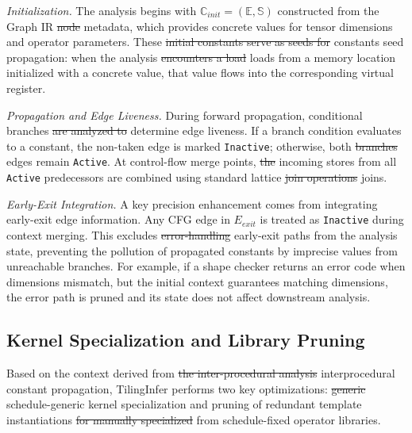 \documentclass[manuscript,screen,review]{acmart}
\theoremstyle{indenteditalic}
\providecommand{\DIFaddtex}[1]{{\protect\color{blue}#1}} %
\providecommand{\DIFidentity}[1]{#1}
\providecommand{\DIFdeltex}[1]{{%
  \protect\color{red}%
  \normalfont\normalsize
  \let\textbf\DIFidentity
  \let\textit\DIFidentity
  \let\texttt\DIFidentity
  \let\textsc\DIFidentity
  \let\textsf\DIFidentity
  \let\emph\DIFidentity
  \let\uline\DIFidentity
  \sout{#1}%
}} %
\providecommand{\DIFaddbegin}{} %
\providecommand{\DIFaddend}{} %
\providecommand{\DIFdelbegin}{} %
\providecommand{\DIFdelend}{} %
\providecommand{\DIFadd}[1]{\texorpdfstring{\DIFaddtex{#1}}{#1}} %
\providecommand{\DIFdel}[1]{\texorpdfstring{\DIFdeltex{#1}}{}} %
\begin{document}
\textit{Initialization.}
The analysis begins with $\mathbb{C}_{init} = (\mathbb{E}, \mathbb{S})$ constructed from the Graph IR \DIFdelbegin \DIFdel{node}\DIFdelend \DIFaddbegin \DIFadd{metadata}\DIFaddend , which provides concrete values for tensor dimensions and operator parameters.
These \DIFdelbegin \DIFdel{initial constants serve as seeds for }\DIFdelend \DIFaddbegin \DIFadd{constants seed }\DIFaddend propagation: when the analysis \DIFdelbegin \DIFdel{encounters a load }\DIFdelend \DIFaddbegin \DIFadd{loads }\DIFaddend from a memory location initialized with a concrete value, that value flows into the corresponding virtual register.

\textit{Propagation and Edge Liveness.}
During forward propagation, conditional branches \DIFdelbegin \DIFdel{are analyzed to }\DIFdelend determine edge liveness.
If a branch condition evaluates to a constant, the non-taken edge is marked \texttt{Inactive}; otherwise, both \DIFdelbegin \DIFdel{branches }\DIFdelend \DIFaddbegin \DIFadd{edges }\DIFaddend remain \texttt{Active}.
At control-flow merge points, \DIFdelbegin \DIFdel{the }\DIFdelend incoming stores from all \texttt{Active} predecessors are combined using standard lattice \DIFdelbegin \DIFdel{join operations}\DIFdelend \DIFaddbegin \DIFadd{joins}\DIFaddend .

\textit{Early-Exit Integration.}
A key precision enhancement comes from integrating early-exit edge information.
Any CFG edge in $E_{exit}$ is treated as \texttt{Inactive} during context merging.
This excludes \DIFdelbegin \DIFdel{error-handling }\DIFdelend \DIFaddbegin \DIFadd{early-exit }\DIFaddend paths from the analysis state, preventing the pollution of propagated constants by imprecise values from unreachable branches.
For example, if a shape checker returns an error code when dimensions mismatch, but the initial context guarantees matching dimensions, the error path is pruned and its state does not affect downstream analysis.


\subsection{Kernel Specialization and Library Pruning} \label{sec:design:specialization}


Based on the context derived from \DIFdelbegin \DIFdel{the inter-procedural analysis}\DIFdelend \DIFaddbegin \DIFadd{interprocedural constant propagation}\DIFaddend , TilingInfer performs two key optimizations: \DIFdelbegin \DIFdel{generic }\DIFdelend \DIFaddbegin \DIFadd{schedule-generic }\DIFaddend kernel specialization and pruning \DIFaddbegin\DIFadd{of }\DIFaddend redundant template instantiations \DIFdelbegin \DIFdel{for manually specialized }\DIFdelend \DIFaddbegin \DIFadd{from schedule-fixed operator }\DIFaddend libraries.
\end{document}
